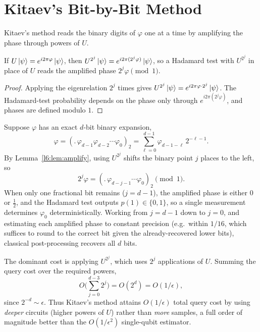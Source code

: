 \section{Kitaev's Bit-by-Bit Method}

Kitaev's method reads the binary digits of $\varphi$ one at a time by
amplifying the phase through powers of $U$.

\begin{lemma}
\label{l6:lem:amplify}
If $U\ket{\psi}=e^{i2\pi\varphi}\ket{\psi}$, then
$U^{2^{j}}\ket{\psi}=e^{i2\pi(2^{j}\varphi)}\ket{\psi}$, so a Hadamard test with
$U^{2^{j}}$ in place of $U$ reads the amplified phase $2^{j}\varphi \pmod 1$.
\end{lemma}

\begin{proof}
Applying the eigenrelation $2^{j}$ times gives
$U^{2^{j}}\ket{\psi}=e^{i2\pi\varphi\cdot 2^{j}}\ket{\psi}$. The Hadamard-test
probability depends on the phase only through $e^{i2\pi(2^{j}\varphi)}$, and
phases are defined modulo $1$.
\end{proof}

Suppose $\varphi$ has an exact $d$-bit binary expansion,
\[
  \varphi=(.\,\varphi_{d-1}\varphi_{d-2}\cdots\varphi_{0})_2
         =\sum_{\ell=0}^{d-1}\varphi_{d-1-\ell}\,2^{-\ell-1}.
\]
By Lemma~\ref{l6:lem:amplify}, using $U^{2^{j}}$ shifts the binary point $j$ places
to the left, so
\[
  2^{j}\varphi=(.\,\varphi_{d-j-1}\cdots\varphi_{0})_2 \pmod 1 .
\]
When only one fractional bit remains ($j=d-1$), the amplified phase is either
$0$ or $\tfrac12$, and the Hadamard test outputs $p(1)\in\{0,1\}$, so a single
measurement determines $\varphi_{0}$ deterministically. Working from $j=d-1$
down to $j=0$, and estimating each amplified phase to constant precision
(e.g.\ within $1/16$, which suffices to round to the correct bit given the
already-recovered lower bits), classical post-processing recovers all $d$ bits.

\begin{remark}
The dominant cost is applying $U^{2^{j}}$, which uses $2^{j}$ applications of
$U$. Summing the query cost over the required powers,
\[
  O\!\Big(\sum_{j=0}^{d-3}2^{j}\Big)=O(2^{d})=O(1/\epsilon),
\]
since $2^{-d}\sim\epsilon$. Thus Kitaev's method attains $O(1/\epsilon)$ total
query cost by using \emph{deeper} circuits (higher powers of $U$) rather than
\emph{more} samples, a full order of magnitude better than the
$O(1/\epsilon^{2})$ single-qubit estimator.
\end{remark}

